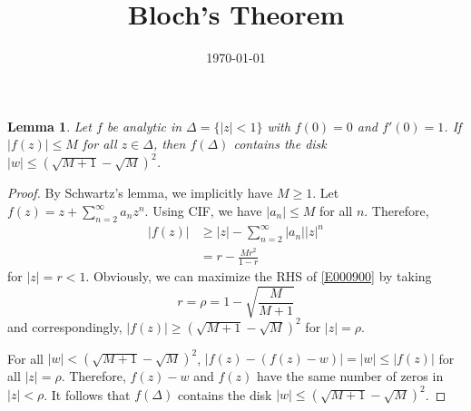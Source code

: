 \documentclass[11pt]{amsart}
\newtheorem{lem}[thm]{Lemma}
\theoremstyle{remark}
\theoremstyle{definition}
\numberwithin{equation}{section}
\begin{document}
\newcommand{\bs}{{\backslash}}
\newcommand{\CS}{{\mathcal S}}
\newcommand{\CA}{{\mathcal A}}
\newcommand{\X}{{\mathcal X}}
\newcommand{\Q} {{\mathbb Q}}
\newcommand{\F} {{\mathcal F}}
\newcommand{\sing}{{\text{sing}}}
\newcommand{\U} {{\mathcal U}}
\newcommand{\B}{{\mathcal B}}

\title{Bloch's Theorem}

\maketitle


%
%
%
\date{\today}

\begin{lem}\label{LEM000900}
    Let $f$ be analytic in $\Delta = \{|z| < 1\}$ with $f(0) = 0$ and $f'(0) = 1$. If $|f(z)|\le M$ for all $z\in \Delta$, then
    $f(\Delta)$ contains the disk $|w| \le (\sqrt{M+1} - \sqrt{M})^2$.
\end{lem}

\begin{proof}
    By Schwartz's lemma, we implicitly have $M \ge 1$. Let $f(z) = z + \sum_{n=2}^\infty a_n z^n$.
    Using CIF, we have
    $|a_n| \le M$ for all $n$. Therefore,
    \begin{equation}\label{E000900}
        \begin{split}
            |f(z)| & \ge |z| - \sum_{n=2}^\infty |a_n| |z|^n
            \\
                   & = r - \frac{M r^2}{1-r}
        \end{split}
    \end{equation}
    for $|z| = r < 1$. Obviously, we can maximize the RHS of \eqref{E000900} by taking
    \begin{equation}\label{E000100}
        r = \rho = 1 - \sqrt{\frac{M}{M+1}}
    \end{equation}
    and correspondingly, $|f(z)| \ge (\sqrt{M+1} - \sqrt{M})^2$ for $|z| = \rho$.

    For all $|w| < (\sqrt{M+1} - \sqrt{M})^2$, $|f(z) - (f(z) - w)| = |w| \le |f(z)|$ for all $|z| = \rho$. Therefore,
    $f(z) - w$ and $f(z)$ have the same number of zeros in $|z| < \rho$. It follows that
    $f(\Delta)$ contains the disk $|w| \le (\sqrt{M+1} - \sqrt{M})^2$.
\end{proof}
\end{document}

